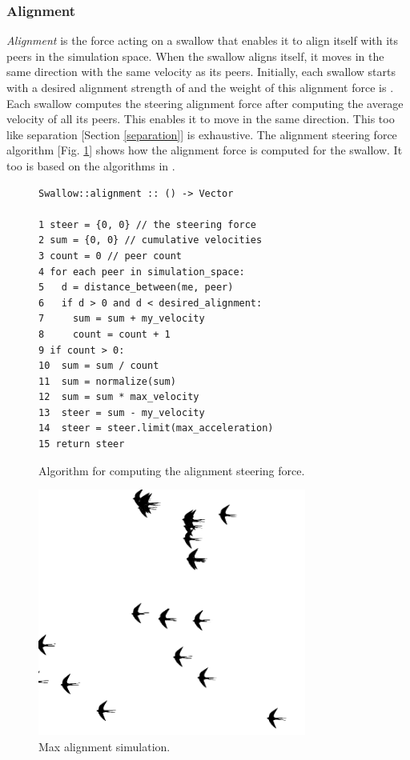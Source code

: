 \documentclass[../main]{subfiles}
\begin{document}
\subsubsection{Alignment}
\label{alignment}

{\em Alignment} is the force acting on a swallow that enables it to align itself with its peers in the simulation space.
When the swallow aligns itself, it moves in the same direction with the same velocity as its peers. Initially, each swallow starts with a desired alignment strength of  and the weight of this alignment force is . Each swallow computes the steering alignment force after computing the average velocity of all its peers. This enables it to move in the same direction. This too like separation [Section \ref{separation}] is exhaustive. The alignment steering force algorithm [Fig. \ref{alignmentLogic}] shows how the alignment force is computed for the swallow. It too is based on the algorithms in \cite{reynolds1999steering, danshiffman}.

\begin{figure}
	\begin{verbatim}
Swallow::alignment :: () -> Vector

1 steer = {0, 0} // the steering force
2 sum = {0, 0} // cumulative velocities
3 count = 0 // peer count
4 for each peer in simulation_space:
5   d = distance_between(me, peer)
6   if d > 0 and d < desired_alignment:
7     sum = sum + my_velocity
8     count = count + 1
9 if count > 0:
10  sum = sum / count
11  sum = normalize(sum)
12  sum = sum * max_velocity
13  steer = sum - my_velocity
14  steer = steer.limit(max_acceleration)
15 return steer
    \end{verbatim}
	\caption{Algorithm for computing the alignment steering force.}
	\label{alignmentLogic}
\end{figure}

\begin{figure}
    \centering
	\includegraphics[scale=0.30, width=250pt, frame]{resources/flocker_max_alignment.png}
	\caption{Max alignment simulation.}
	\label{maxAlignmentImg}
\end{figure}
\end{document}
